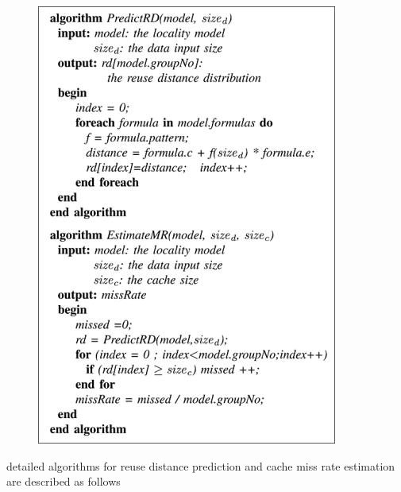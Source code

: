 \documentclass[12pt]{article}
\begin{document}
\vspace{\baselineskip}



\begin{figure}[H]
	\begin{Center}
		\includegraphics[width=3.9in,height=5.73in]{./media/image3.jpeg}
	\end{Center}
\end{figure}



\begin{adjustwidth}{0.0in}{0.38in}
{\fontsize{11pt}{13.2pt}\selectfont \textcolor[HTML]{333333}{detailed algorithms for reuse distance prediction and cache miss rate estimation are described as follows }\par}\par

\end{adjustwidth}
\end{document}

